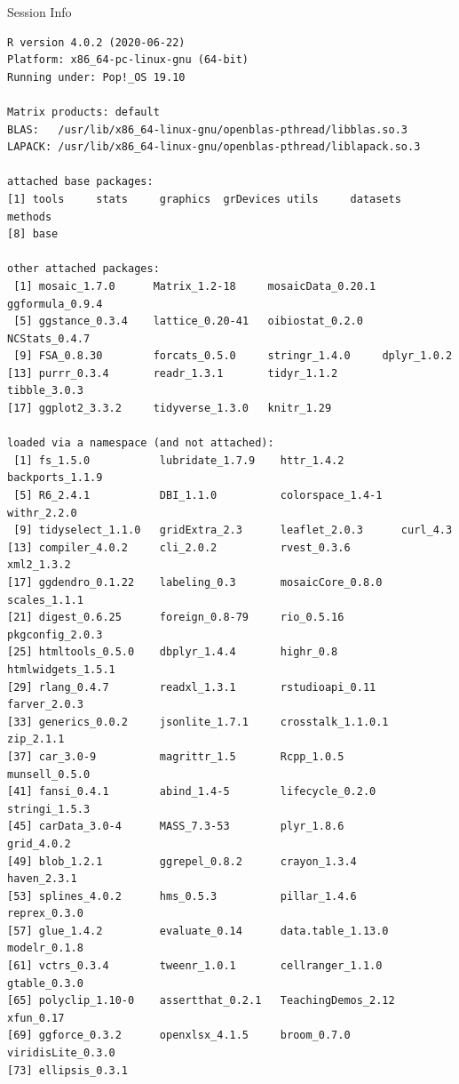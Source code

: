 \documentclass[10pt,handout]{beamer}\usepackage[]{graphicx}\usepackage[]{color}
\makeatletter
\newenvironment{kframe}{%
 \def\at@end@of@kframe{}%
 \ifinner\ifhmode%
  \def\at@end@of@kframe{\end{minipage}}%
  \begin{minipage}{\columnwidth}%
 \fi\fi%
 \def\FrameCommand##1{\hskip\@totalleftmargin \hskip-\fboxsep
 \colorbox{shadecolor}{##1}\hskip-\fboxsep
     \hskip-\linewidth \hskip-\@totalleftmargin \hskip\columnwidth}%
 \MakeFramed {\advance\hsize-\width
   \@totalleftmargin\z@ \linewidth\hsize
   \@setminipage}}%
 {\par\unskip\endMakeFramed%
 \at@end@of@kframe}
\newenvironment{knitrout}{}{} %
\makeatother
\begin{document}
	
\begin{frame}[fragile]{Session Info}
	\tiny
	
\begin{knitrout}\tiny
{}\color{fgcolor}\begin{kframe}
\begin{verbatim}
R version 4.0.2 (2020-06-22)
Platform: x86_64-pc-linux-gnu (64-bit)
Running under: Pop!_OS 19.10

Matrix products: default
BLAS:   /usr/lib/x86_64-linux-gnu/openblas-pthread/libblas.so.3
LAPACK: /usr/lib/x86_64-linux-gnu/openblas-pthread/liblapack.so.3

attached base packages:
[1] tools     stats     graphics  grDevices utils     datasets  methods  
[8] base     

other attached packages:
 [1] mosaic_1.7.0      Matrix_1.2-18     mosaicData_0.20.1 ggformula_0.9.4  
 [5] ggstance_0.3.4    lattice_0.20-41   oibiostat_0.2.0   NCStats_0.4.7    
 [9] FSA_0.8.30        forcats_0.5.0     stringr_1.4.0     dplyr_1.0.2      
[13] purrr_0.3.4       readr_1.3.1       tidyr_1.1.2       tibble_3.0.3     
[17] ggplot2_3.3.2     tidyverse_1.3.0   knitr_1.29       

loaded via a namespace (and not attached):
 [1] fs_1.5.0           lubridate_1.7.9    httr_1.4.2         backports_1.1.9   
 [5] R6_2.4.1           DBI_1.1.0          colorspace_1.4-1   withr_2.2.0       
 [9] tidyselect_1.1.0   gridExtra_2.3      leaflet_2.0.3      curl_4.3          
[13] compiler_4.0.2     cli_2.0.2          rvest_0.3.6        xml2_1.3.2        
[17] ggdendro_0.1.22    labeling_0.3       mosaicCore_0.8.0   scales_1.1.1      
[21] digest_0.6.25      foreign_0.8-79     rio_0.5.16         pkgconfig_2.0.3   
[25] htmltools_0.5.0    dbplyr_1.4.4       highr_0.8          htmlwidgets_1.5.1 
[29] rlang_0.4.7        readxl_1.3.1       rstudioapi_0.11    farver_2.0.3      
[33] generics_0.0.2     jsonlite_1.7.1     crosstalk_1.1.0.1  zip_2.1.1         
[37] car_3.0-9          magrittr_1.5       Rcpp_1.0.5         munsell_0.5.0     
[41] fansi_0.4.1        abind_1.4-5        lifecycle_0.2.0    stringi_1.5.3     
[45] carData_3.0-4      MASS_7.3-53        plyr_1.8.6         grid_4.0.2        
[49] blob_1.2.1         ggrepel_0.8.2      crayon_1.3.4       haven_2.3.1       
[53] splines_4.0.2      hms_0.5.3          pillar_1.4.6       reprex_0.3.0      
[57] glue_1.4.2         evaluate_0.14      data.table_1.13.0  modelr_0.1.8      
[61] vctrs_0.3.4        tweenr_1.0.1       cellranger_1.1.0   gtable_0.3.0      
[65] polyclip_1.10-0    assertthat_0.2.1   TeachingDemos_2.12 xfun_0.17         
[69] ggforce_0.3.2      openxlsx_4.1.5     broom_0.7.0        viridisLite_0.3.0 
[73] ellipsis_0.3.1    
\end{verbatim}
\end{kframe}
\end{knitrout}
	
\end{frame}
\end{document}
